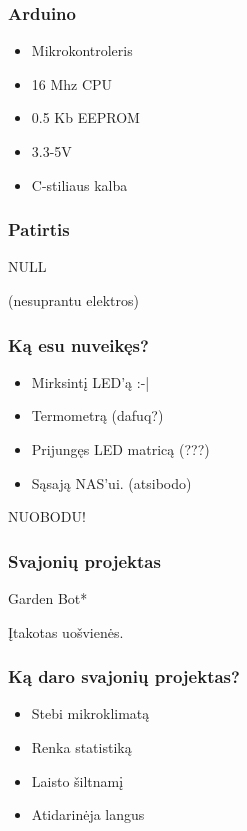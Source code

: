 \documentclass[12pt,a4paper]{beamer}
\begin{document}
\begin{frame}
    \frametitle{Arduino}

    \begin{itemize}
        \item Mikrokontroleris
        \item 16 Mhz CPU
        \item 0.5 Kb EEPROM
        \item 3.3-5V
        \item C-stiliaus kalba
    \end{itemize}
    
\end{frame}

\begin{frame}
    \frametitle{Patirtis}
	\begin{center}
        {\Huge NULL}
	\end{center}
    \begin{center}
        (nesuprantu elektros)
    \end{center}
\end{frame}


\begin{frame}
    \frametitle{Ką esu nuveikęs?}

    \pause
    \begin{itemize}
        \item Mirksintį LED'ą :-|
        \pause
        \item Termometrą (dafuq?)
        \pause
        \item Prijungęs LED matricą (???)
        \pause
        \item Sąsają NAS'ui. (atsibodo)
    \end{itemize}
    \pause
    \begin{center}
        NUOBODU!
    \end{center}
\end{frame}

\begin{frame}
    \frametitle{Svajonių projektas}

    \begin{center}
        {\Huge Garden Bot*}
    \end{center}

    \vskip1cm
    {\small *Įtakotas uošvienės.}
    
\end{frame}

\begin{frame}
    \frametitle{Ką daro svajonių projektas?}

    \begin{itemize}
        \item Stebi mikroklimatą
        \item Renka statistiką
        \item Laisto šiltnamį
        \item Atidarinėja langus
    \end{itemize}
\end{frame}
\end{document}
